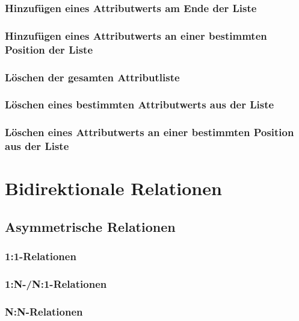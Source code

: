 \documentclass[oneside]{ausarbeitung}
\begin{document}
\subsection{Hinzufügen eines Attributwerts am Ende der Liste}
\label{sub:attributes_N_write_end}

\subsection{Hinzufügen eines Attributwerts an einer bestimmten Position der Liste}
\label{sub:attributes_N_write_index}

\subsection{Löschen der gesamten Attributliste}
\label{sub:attributes_N_remove}

\subsection{Löschen eines bestimmten Attributwerts aus der Liste}
\label{sub:attributes_N_remove_value}

\subsection{Löschen eines Attributwerts an einer bestimmten Position aus der Liste}
\label{sub:attributes_N_remove_index}

\chapter{Bidirektionale Relationen}
\label{cha:relations}

\section{Asymmetrische Relationen}
\label{sec:relations_asymmetric}

\subsection{1:1-Relationen}
\label{sub:relations_asymmetric_1_1}

\subsection{1:N-/N:1-Relationen}
\label{sub:relations_asymmetric_1_N}

\subsection{N:N-Relationen}
\label{sub:relations_asymmetric_N_N}
\end{document}
